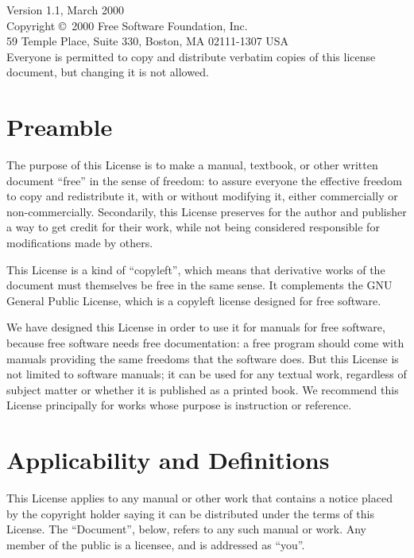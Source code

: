 \documentclass[twoside,openright,a4paper]{book}
\begin{document}
\begingroup
	\small

	Version 1.1, March 2000\\

	Copyright \copyright\ 2000  Free Software Foundation, Inc.\\
		59 Temple Place, Suite 330, Boston, MA  02111-1307  USA\\
	Everyone is permitted to copy and distribute verbatim copies
	of this license document, but changing it is not allowed.

	\section*{Preamble}

	The purpose of this License is to make a manual, textbook, or other
	written document ``free'' in the sense of freedom: to assure everyone
	the effective freedom to copy and redistribute it, with or without
	modifying it, either commercially or non-commercially.  Secondarily,
	this License preserves for the author and publisher a way to get
	credit for their work, while not being considered responsible for
	modifications made by others.

	This License is a kind of ``copyleft'', which means that derivative
	works of the document must themselves be free in the same sense.  It
	complements the GNU General Public License, which is a copyleft
	license designed for free software.

	We have designed this License in order to use it for manuals for free
	software, because free software needs free documentation: a free
	program should come with manuals providing the same freedoms that the
	software does.  But this License is not limited to software manuals;
	it can be used for any textual work, regardless of subject matter or
	whether it is published as a printed book.  We recommend this License
	principally for works whose purpose is instruction or reference.

	\section{Applicability and Definitions}

	This License applies to any manual or other work that contains a
	notice placed by the copyright holder saying it can be distributed
	under the terms of this License.  The ``Document'', below, refers to any
	such manual or work.  Any member of the public is a licensee, and is
	addressed as ``you''.
\end{document}
